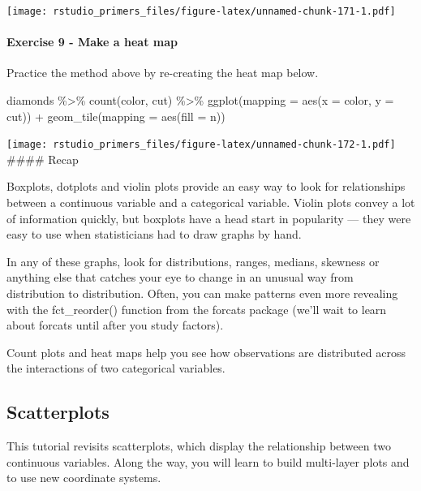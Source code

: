 \documentclass[
]{article}
\newenvironment{Shaded}{\begin{snugshade}}{\end{snugshade}}
\newcommand{\AttributeTok}[1]{\textcolor[rgb]{0.77,0.63,0.00}{#1}}
\newcommand{\FunctionTok}[1]{\textcolor[rgb]{0.00,0.00,0.00}{#1}}
\newcommand{\NormalTok}[1]{#1}
\newcommand{\SpecialCharTok}[1]{\textcolor[rgb]{0.00,0.00,0.00}{#1}}
\begin{document}
\texttt{[image: rstudio\_primers\_files/figure-latex/unnamed-chunk-171-1.pdf]}

\hypertarget{exercise-9---make-a-heat-map}{%
\paragraph{Exercise 9 - Make a heat
map}\label{exercise-9---make-a-heat-map}}

Practice the method above by re-creating the heat map below.

\begin{Shaded}
\begin{Highlighting}[]
\NormalTok{diamonds }\SpecialCharTok{\%\textgreater{}\%} 
 \FunctionTok{count}\NormalTok{(color, cut) }\SpecialCharTok{\%\textgreater{}\%} 
   \FunctionTok{ggplot}\NormalTok{(}\AttributeTok{mapping =} \FunctionTok{aes}\NormalTok{(}\AttributeTok{x =}\NormalTok{ color, }\AttributeTok{y =}\NormalTok{ cut)) }\SpecialCharTok{+}
     \FunctionTok{geom\_tile}\NormalTok{(}\AttributeTok{mapping =} \FunctionTok{aes}\NormalTok{(}\AttributeTok{fill =}\NormalTok{ n))}
\end{Highlighting}
\end{Shaded}

\texttt{[image: rstudio\_primers\_files/figure-latex/unnamed-chunk-172-1.pdf]}
\#\#\#\# Recap

Boxplots, dotplots and violin plots provide an easy way to look for
relationships between a continuous variable and a categorical variable.
Violin plots convey a lot of information quickly, but boxplots have a
head start in popularity --- they were easy to use when statisticians
had to draw graphs by hand.

In any of these graphs, look for distributions, ranges, medians,
skewness or anything else that catches your eye to change in an unusual
way from distribution to distribution. Often, you can make patterns even
more revealing with the fct\_reorder() function from the forcats package
(we'll wait to learn about forcats until after you study factors).

Count plots and heat maps help you see how observations are distributed
across the interactions of two categorical variables.

\hypertarget{scatterplots}{%
\subsection{Scatterplots}\label{scatterplots}}

This tutorial revisits scatterplots, which display the relationship
between two continuous variables. Along the way, you will learn to build
multi-layer plots and to use new coordinate systems.
\end{document}
